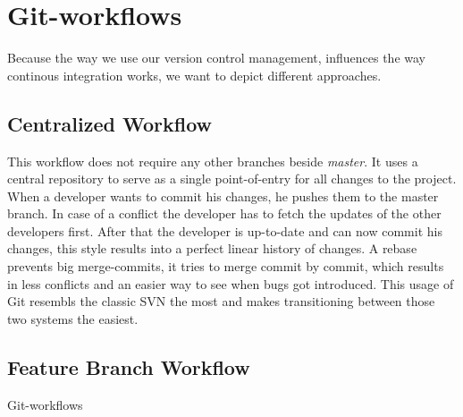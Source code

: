 \section{Git-workflows}\label{sec:Git-workflows}

Because the way we use our version control management, influences the way continous integration works, we want to depict different approaches.

\subsection{Centralized Workflow}\label{sec:Centralized Workflow}
This workflow does not require any other branches beside \textit{master}. It uses a central repository to serve as a single point-of-entry for all changes to the project.
When a developer wants to commit his changes, he pushes them to the master branch. In case of a conflict the developer has to fetch the updates of the other developers first.
After that the developer is up-to-date and can now commit his changes, this style results into a perfect linear history of changes.
A rebase prevents big merge-commits, it tries to merge commit by commit, which results in less conflicts and an easier way to see when bugs got introduced.
This usage of Git resembls the classic SVN the most and makes transitioning between those two systems the easiest. \\

\subsection{Feature Branch Workflow}
{Git-workflows}
